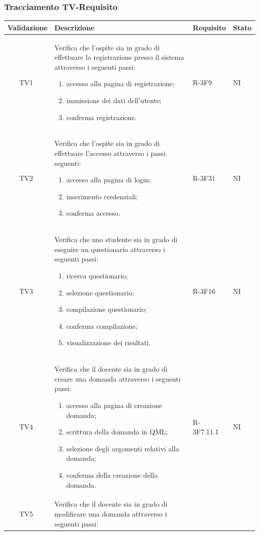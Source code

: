 \documentclass[12pt,a4paper]{article}
\begin{document}
	\subsubsection{Tracciamento TV-Requisito}
	\begin{longtable}{r l p{6cm} l l}
		\midrule
		\multicolumn{2}{c}{\textbf{Validazione}} & \textbf{Descrizione} & \textbf{Requisito} & \textbf{Stato}\tabularnewline
		\midrule
		\midrule
		& TV1 & Verifica che l'ospite sia in grado di effettuare la registrazione presso il sistema attraverso i seguenti passi:
		
		\begin{enumerate}
			\item accesso alla pagina di registrazione;
			\item immissione dei dati dell'utente;
			\item conferma registrazione.
		\end{enumerate} & R-3F9 & NI\tabularnewline
		\midrule
		& TV2 & Verifica che l'ospite sia in grado di effettuare l'accesso attraverso i passi seguenti:
		
		\begin{enumerate}
			\item accesso alla pagina di login;
			\item inserimento credenziali;
			\item conferma accesso.
		\end{enumerate} & R-3F31 & NI\tabularnewline
		\midrule
		& TV3 & Verifica che uno studente sia in grado di eseguire un questionario attraverso i seguenti passi:
		
		\begin{enumerate}
			\item ricerca questionario;
			\item selezione questionario;
			\item compilazione questionario;
			\item conferma compilazione;
			\item visualizzazione dei risultati.
		\end{enumerate} & R-3F16 & NI\tabularnewline
		\midrule
		& TV4 & Verifica che il docente sia in grado di creare una domanda attraverso i seguenti passi:
		
		\begin{enumerate}
			\item accesso alla pagina di creazione domanda;
			\item scrittura della domanda in QML;
			\item selezione degli argomenti relativi alla domanda;
			\item conferma della creazione della domanda.
		\end{enumerate} & R-3F7.11.1 & NI\tabularnewline
		\midrule
		& TV5 & Verifica che il docente sia in grado di modificare una domanda attraverso i seguenti passi:
		

\end{longtable}
\end{document}
